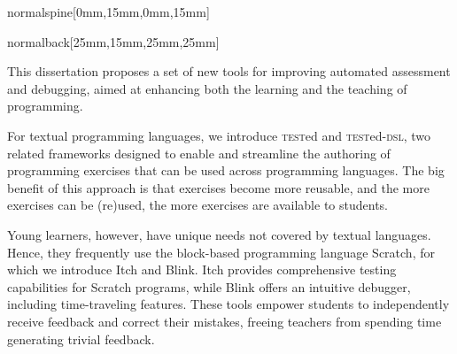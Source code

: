 \documentclass[coverheight=240mm,coverwidth=170mm,spinewidth=15mm]{bookcover}
\begin{document}
\begin{bookcover}
    \begin{bookcoverelement}{normal}{spine}[0mm,15mm,0mm,15mm]%
        \centering
        \hspace*{0.1cm}
         \par
        \vspace*{\fill}
    \end{bookcoverelement}
    \begin{bookcoverelement}{normal}{back}[25mm,15mm,25mm,25mm]
        \fontsize{11pt}{15pt}\selectfont{}\setlength{\parskip}{3mm}

        This dissertation proposes a set of new tools for improving automated assessment and debugging, aimed at enhancing both the learning and the teaching of programming.

        For textual programming languages, we introduce \textsc{test}ed and \textsc{test}ed-\textsc{dsl}, two related frameworks designed to enable and streamline the authoring of programming exercises that can be used across programming languages.
        The big benefit of this approach is that exercises become more reusable, and the more exercises can be (re)used, the more exercises are available to students.

        Young learners, however, have unique needs not covered by textual languages.
        Hence, they frequently use the block-based programming language Scratch, for which we introduce Itch and Blink.
        Itch provides comprehensive testing capabilities for Scratch programs, while Blink offers an intuitive debugger, including time-traveling features.
        These tools empower students to independently receive feedback and correct their mistakes, freeing teachers from spending time generating trivial feedback.

        \vspace*{\fill}%
        \begin{center}%
        \end{center}
    \end{bookcoverelement}
\end{bookcover}
\end{document}
